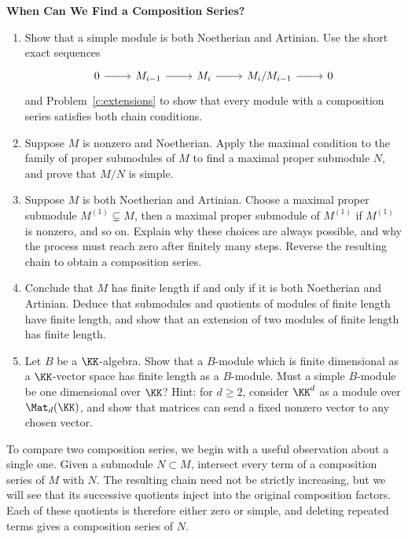 \documentclass[12pt,reqno]{amsart}
\begin{document}
\begin{problems}
\item\label{c:finite-length} \textbf{When Can We Find a Composition Series?}
\begin{enumerate}
\item Show that a simple module is both Noetherian and Artinian. Use the short exact sequences
\[
\begin{tikzcd}
0 \arrow[r] & M_{i-1} \arrow[r] & M_i \arrow[r] & M_i/M_{i-1} \arrow[r] & 0
\end{tikzcd}
\]
and Problem~\ref{c:extensions} to show that every module with a composition series satisfies both chain conditions.
\item Suppose $M$ is nonzero and Noetherian. Apply the maximal condition to the family of proper submodules of $M$ to find a maximal proper submodule $N$, and prove that $M/N$ is simple.
\item Suppose $M$ is both Noetherian and Artinian. Choose a maximal proper submodule $M^{(1)}\subsetneq M$, then a maximal proper submodule of $M^{(1)}$ if $M^{(1)}$ is nonzero, and so on. Explain why these choices are always possible, and why the process must reach zero after finitely many steps. Reverse the resulting chain to obtain a composition series.
\item Conclude that $M$ has finite length if and only if it is both Noetherian and Artinian. Deduce that submodules and quotients of modules of finite length have finite length, and show that an extension of two modules of finite length has finite length.
\item Let $B$ be a $\KK$-algebra. Show that a $B$-module which is finite dimensional as a $\KK$-vector space has finite length as a $B$-module. Must a simple $B$-module be one dimensional over $\KK$? Hint: for $d\geq2$, consider $\KK^d$ as a module over $\Mat_d(\KK)$, and show that matrices can send a fixed nonzero vector to any chosen vector.
\end{enumerate}
\end{problems}

\hrulefill

To compare two composition series, we begin with a useful observation about a single one. Given a submodule $N\subset M$, intersect every term of a composition series of $M$ with $N$. The resulting chain need not be strictly increasing, but we will see that its successive quotients inject into the original composition factors. Each of these quotients is therefore either zero or simple, and deleting repeated terms gives a composition series of $N$.
\end{document}
